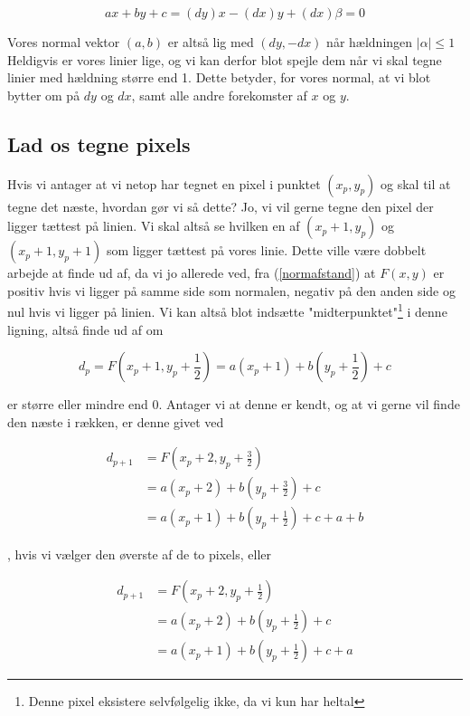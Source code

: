 \documentclass[a4paper, 10pt]{article}
\begin{document}
\begin{equation}
ax + by + c = (dy)x - (dx)y + (dx)\beta = 0 \nonumber
\end{equation}

Vores normal vektor $(a,b)$ er altså lig med $(dy, -dx)$ når hældningen $|\alpha| \leq 1$
Heldigvis er vores linier lige, og vi kan derfor blot spejle dem når vi skal tegne linier med hældning større end 1. 
Dette betyder, for vores normal, at vi blot bytter om på $dy$ og $dx$, samt alle andre forekomster af $x$ og $y$.

\subsection{Lad os tegne pixels}
Hvis vi antager at vi netop har tegnet en pixel i punktet $(x_p, y_p)$ og skal til at tegne det næste, hvordan gør vi så dette?
Jo, vi vil gerne tegne den pixel der ligger tættest på linien.
Vi skal altså se hvilken en af $(x_p + 1, y_p)$ og $(x_p + 1, y_p + 1)$ som ligger tættest på vores linie.
Dette ville være dobbelt arbejde at finde ud af, da vi jo allerede ved, fra (\ref{normafstand}) at $F(x,y)$ er positiv hvis vi ligger på samme side som normalen, negativ på den anden side og nul hvis vi ligger på linien.
Vi kan altså blot indsætte "midterpunktet"\footnote{Denne pixel eksistere selvfølgelig ikke, da vi kun har heltal} i denne ligning, altså finde ud af om 

\begin{equation}
d_p = F(x_p + 1, y_p + \frac{1}{2}) = a(x_p + 1) + b(y_p + \frac{1}{2}) + c \label{dp}
\end{equation}

 er større eller mindre end $0$.
Antager vi at denne er kendt, og at vi gerne vil finde den næste i rækken, er denne givet ved 

\begin{align}
d_{p+1} &= F(x_p + 2, y_p + \frac{3}{2}) \nonumber\\
        &= a(x_p + 2) + b(y_p + \frac{3}{2}) + c \nonumber\\
        &= a(x_p + 1) + b(y_p + \frac{1}{2}) + c + a + b
\end{align}

, hvis vi vælger den øverste af de to pixels, eller

\begin{align}
d_{p+1} &= F(x_p + 2, y_p + \frac{1}{2}) \nonumber\\
        &= a(x_p + 2) + b(y_p + \frac{1}{2}) + c \nonumber\\
        &= a(x_p + 1) + b(y_p + \frac{1}{2}) + c + a
\end{align}
\end{document}

